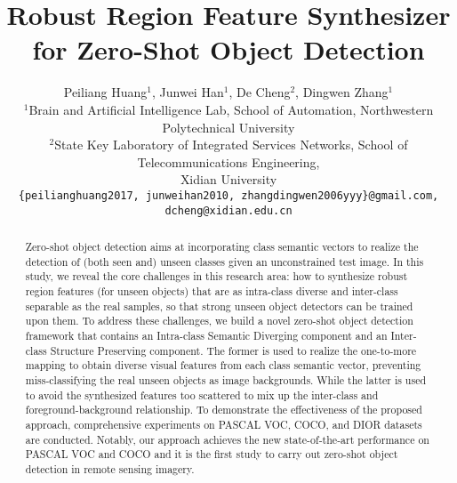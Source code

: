 \documentclass[10pt,twocolumn,letterpaper]{article}
\begin{document}
\title{Robust Region Feature Synthesizer for Zero-Shot Object Detection}

\author{Peiliang Huang$^{1}$, Junwei Han$^{1}$, De Cheng$^{2}$, Dingwen Zhang$^{1}$\\
$^{1}$Brain and Artificial Intelligence Lab, School of Automation, Northwestern Polytechnical University\\
$^{2}$State Key Laboratory of Integrated Services Networks, School of Telecommunications Engineering, \\Xidian University\\
{\tt\small \{peilianghuang2017, junweihan2010, zhangdingwen2006yyy\}@gmail.com, dcheng@xidian.edu.cn}
}
\maketitle

\begin{abstract}
  Zero-shot object detection aims at incorporating class semantic vectors to realize the detection of (both seen and) unseen classes given an unconstrained test image. In this study, we reveal the core challenges in this research area: how to synthesize robust region features (for unseen objects) that are as intra-class diverse and inter-class separable as the real samples, so that strong unseen object detectors can be trained upon them. To address these challenges, we build a novel zero-shot object detection framework that contains an Intra-class Semantic Diverging component and an Inter-class Structure Preserving component. The former is used to realize the one-to-more mapping to obtain diverse visual features from each class semantic vector, preventing miss-classifying the real unseen objects as image backgrounds. While the latter is used to avoid the synthesized features too scattered to mix up the inter-class and foreground-background relationship. To demonstrate the effectiveness of the proposed approach, comprehensive experiments on PASCAL VOC, COCO, and DIOR datasets are conducted. Notably, our approach achieves the new state-of-the-art performance on PASCAL VOC and COCO and it is the first study to carry out zero-shot object detection in remote sensing imagery.

\end{abstract}

\vspace{-6mm}
\end{document}
